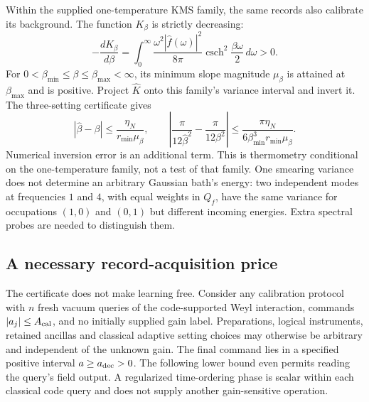 \documentclass[11pt]{article}
\theoremstyle{definition}
\theoremstyle{remark}
\begin{document}
Within the supplied one-temperature KMS family, the same records also
calibrate its background. The function $K_\beta$ is strictly decreasing:
\[
 -\frac{dK_\beta}{d\beta}
 =\int_0^\infty\frac{\omega^2|\hat f(\omega)|^2}{8\pi}
                 \operatorname{csch}^2\frac{\beta\omega}{2}\,d\omega>0.
\]
For $0<\beta_{\min}\le\beta\le\beta_{\max}<\infty$, its minimum slope magnitude
$\mu_\beta$ is attained at $\beta_{\max}$ and is positive. Project
$\widehat K$ onto this family's variance interval and invert it. The
three-setting certificate gives
\begin{equation}
 |\widehat\beta-\beta|\le\frac{\eta_N}{r_{\min}\mu_\beta},\qquad
 \left|\frac{\pi}{12\widehat\beta^2}-\frac{\pi}{12\beta^2}\right|
 \le\frac{\pi\eta_N}{6\beta_{\min}^3 r_{\min}\mu_\beta}.
 \label{eq:background_calibration}
\end{equation}
Numerical inversion error is an additional term. This is thermometry
conditional on the one-temperature family, not a test of that family.
One smearing variance does not determine an arbitrary Gaussian bath's
energy: two independent modes at frequencies $1$ and $4$, with equal
weights in $Q_f$, have the same variance for occupations $(1,0)$ and
$(0,1)$ but different incoming energies. Extra spectral probes are needed
to distinguish them.

\subsection{A necessary record-acquisition price}

The certificate does not make learning free. Consider any calibration
protocol with $n$ fresh vacuum queries of the code-supported Weyl
interaction, commands $|a_j|\le A_{\rm cal}$, and no initially supplied
gain label. Preparations, logical instruments, retained ancillas and
classical adaptive setting choices may otherwise be arbitrary and
independent of the unknown gain. The final command lies in a specified
positive interval $a\ge a_{\rm dec}>0$. The following lower bound
even permits reading the query's field output. A regularized
time-ordering phase is scalar within each classical code query and
does not supply another gain-sensitive operation.
\end{document}
